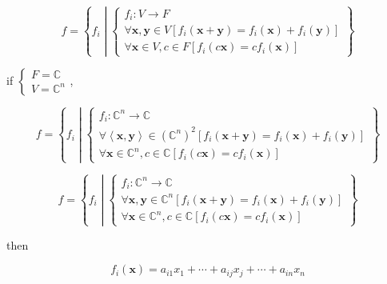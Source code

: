 \documentclass[
]{book}
\theoremstyle{definition}
\theoremstyle{definition}
\theoremstyle{definition}
\theoremstyle{definition}
\theoremstyle{remark}
\begin{document}
\[
f=\left\{ f_{{\scriptscriptstyle i}}\middle|\begin{cases}
f_{{\scriptscriptstyle i}}:V\rightarrow F\\
\forall\boldsymbol{x},\boldsymbol{y}\in V\left[f_{{\scriptscriptstyle i}}\left(\boldsymbol{x}+\boldsymbol{y}\right)=f_{{\scriptscriptstyle i}}\left(\boldsymbol{x}\right)+f_{{\scriptscriptstyle i}}\left(\boldsymbol{y}\right)\right]\\
\forall\boldsymbol{x}\in V,c\in F\left[f_{{\scriptscriptstyle i}}\left(c\boldsymbol{x}\right)=cf_{{\scriptscriptstyle i}}\left(\boldsymbol{x}\right)\right]
\end{cases}\right\} 
\]

if \(\begin{cases} F=\mathbb{C}\\ V=\mathbb{C}^{n} \end{cases}\),

\[
f=\left\{ f_{{\scriptscriptstyle i}}\middle|\begin{cases}
f_{{\scriptscriptstyle i}}:\mathbb{C}^{n}\rightarrow\mathbb{C}\\
\forall\left\langle \boldsymbol{x},\boldsymbol{y}\right\rangle \in\left(\mathbb{C}^{n}\right)^{2}\left[f_{{\scriptscriptstyle i}}\left(\boldsymbol{x}+\boldsymbol{y}\right)=f_{{\scriptscriptstyle i}}\left(\boldsymbol{x}\right)+f_{{\scriptscriptstyle i}}\left(\boldsymbol{y}\right)\right]\\
\forall\boldsymbol{x}\in\mathbb{C}^{n},c\in\mathbb{C}\left[f_{{\scriptscriptstyle i}}\left(c\boldsymbol{x}\right)=cf_{{\scriptscriptstyle i}}\left(\boldsymbol{x}\right)\right]
\end{cases}\right\} 
\]

\[
f=\left\{ f_{{\scriptscriptstyle i}}\middle|\begin{cases}
f_{{\scriptscriptstyle i}}:\mathbb{C}^{n}\rightarrow\mathbb{C}\\
\forall\boldsymbol{x},\boldsymbol{y}\in\mathbb{C}^{n}\left[f_{{\scriptscriptstyle i}}\left(\boldsymbol{x}+\boldsymbol{y}\right)=f_{{\scriptscriptstyle i}}\left(\boldsymbol{x}\right)+f_{{\scriptscriptstyle i}}\left(\boldsymbol{y}\right)\right]\\
\forall\boldsymbol{x}\in\mathbb{C}^{n},c\in\mathbb{C}\left[f_{{\scriptscriptstyle i}}\left(c\boldsymbol{x}\right)=cf_{{\scriptscriptstyle i}}\left(\boldsymbol{x}\right)\right]
\end{cases}\right\} 
\]

then

\[
f_{{\scriptscriptstyle i}}\left(\boldsymbol{x}\right)=a_{{\scriptscriptstyle i1}}x_{{\scriptscriptstyle 1}}+\cdots+a_{{\scriptscriptstyle ij}}x_{{\scriptscriptstyle j}}+\cdots+a_{{\scriptscriptstyle in}}x_{{\scriptscriptstyle n}}
\]
\end{document}

